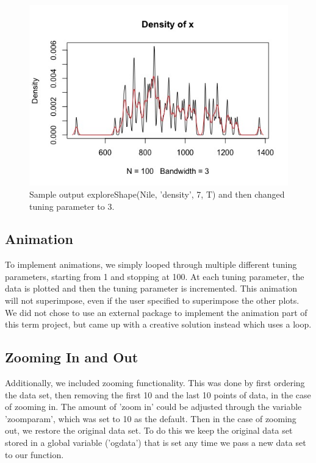 \documentclass{article}
\begin{document}
\begin{figure}[H]
\centering
\includegraphics[scale=0.5]{Nile, 7 superimposed on 3.jpeg}
\caption{Sample output exploreShape(Nile, 'density', 7, T) and then changed tuning parameter to 3. }
\label{fig:Nile density graph 3 on 7}
\end{figure}

\subsection{Animation}
To implement animations, we simply looped through multiple different tuning parameters, starting from 1 and stopping at 100. At each tuning parameter, the data is plotted and then the tuning parameter is incremented. This animation will not superimpose, even if the user specified to superimpose the other plots. We did not chose to use an external package to implement the animation part of this term project, but came up with a creative solution instead which uses a loop.

\subsection{Zooming In and Out}
Additionally, we included zooming functionality. This was done by first ordering the data set, then removing the first 10 and the last 10 points of data, in the case of zooming in. The amount of 'zoom in' could be adjusted through the variable 'zoomparam', which was set to 10 as the default. Then in the case of zooming out, we restore the original data set. To do this we keep the original data set stored in a global variable ('ogdata') that is set any time we pass a new data set to our function.
\end{document}

